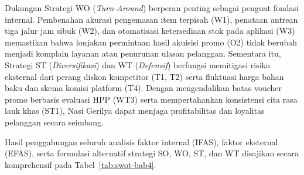Dukungan Strategi WO (\textit{Turn-Around}) berperan penting sebagai penguat fondasi internal. Pembenahan akurasi pengemasan item terpisah (W1), penataan antrean tiga jalur jam sibuk (W2), dan otomatisasi ketersediaan stok pada aplikasi (W3) memastikan bahwa lonjakan permintaan hasil akuisisi promo (O2) tidak berubah menjadi komplain layanan atau penurunan ulasan pelanggan. Sementara itu, Strategi ST (\textit{Diversifikasi}) dan WT (\textit{Defensif}) berfungsi memitigasi risiko eksternal dari perang diskon kompetitor (T1, T2) serta fluktuasi harga bahan baku dan skema komisi platform (T4). Dengan mengendalikan batas voucher promo berbasis evaluasi HPP (WT3) serta mempertahankan konsistensi cita rasa lauk khas (ST1), Nasi Gerilya dapat menjaga profitabilitas dan loyalitas pelanggan secara seimbang.

Hasil penggabungan seluruh analisis faktor internal (IFAS), faktor eksternal (EFAS), serta formulasi alternatif strategi SO, WO, ST, dan WT disajikan secara komprehensif pada Tabel~\ref{tab:swot-bab4}.

